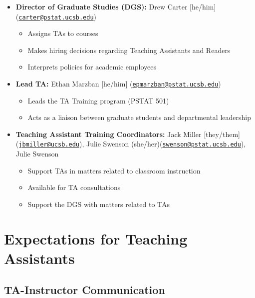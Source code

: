 \documentclass[
  letterpaper,
  DIV=11,
  numbers=noendperiod]{scrreprt}
\providecommand{\tightlist}{%
  \setlength{\itemsep}{0pt}\setlength{\parskip}{0pt}}\usepackage{longtable,booktabs,array}
\begin{document}
\begin{itemize}
\tightlist
\item
  \textbf{Director of Graduate Studies (DGS):} Drew Carter {[}he/him{]}
  (\href{mailto:carter@pstat.ucsb.edu}{\nolinkurl{carter@pstat.ucsb.edu}})

  \begin{itemize}
  \tightlist
  \item
    Assigns TAs to courses
  \item
    Makes hiring decisions regarding Teaching Assistants and Readers
  \item
    Interprets policies for academic employees
  \end{itemize}
\item
  \textbf{Lead TA:} Ethan Marzban {[}he/him{]}
  (\href{mailto:epmarzban@pstat.ucsb.edu}{\nolinkurl{epmarzban@pstat.ucsb.edu}})

  \begin{itemize}
  \tightlist
  \item
    Leads the TA Training program (PSTAT 501)
  \item
    Acts as a liaison between graduate students and departmental
    leadership
  \end{itemize}
\item
  \textbf{Teaching Assistant Training Coordinators:} Jack Miller
  {[}they/them{]}
  (\href{mailto:jbmiller@ucsb.edu}{\nolinkurl{jbmiller@ucsb.edu}}),
  Julie Swenson
  (she/her)(\href{mailto:swenson@pstat.ucsb.edu}{\nolinkurl{swenson@pstat.ucsb.edu}}),
  Julie Swenson

  \begin{itemize}
  \tightlist
  \item
    Support TAs in matters related to classroom instruction
  \item
    Available for TA consultations
  \item
    Support the DGS with matters related to TAs
  \end{itemize}
\end{itemize}

\part{\textbf{Expectations for Teaching Assistants}}

\hypertarget{ta-instructor-communication}{%
\chapter{TA-Instructor
Communication}\label{ta-instructor-communication}}
\end{document}

